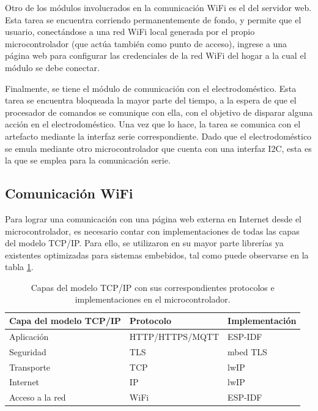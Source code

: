 Otro de los módulos involucrados en la comunicación WiFi es el del servidor web. Esta tarea se encuentra corriendo permanentemente de fondo, y permite que el usuario, conectándose a una red WiFi local generada por el propio microcontrolador (que actúa también como punto de acceso), ingrese a una página web para configurar las credenciales de la red WiFi del hogar a la cual el módulo se debe conectar.

Finalmente, se tiene el módulo de comunicación con el electrodoméstico. Esta tarea se encuentra bloqueada la mayor parte del tiempo, a la espera de que el procesador de comandos se comunique con ella, con el objetivo de disparar alguna acción en el electrodoméstico. Una vez que lo hace, la tarea se comunica con el artefacto mediante la interfaz serie correspondiente. Dado que el electrodoméstico se emula mediante otro microcontrolador que cuenta con una interfaz I2C, esta es la que se emplea para la comunicación serie.


\subsection{Comunicación WiFi}
\label{sec:wifi_com}

Para lograr una comunicación con una página web externa en Internet desde el microcontrolador, es necesario contar con implementaciones de todas las capas del modelo TCP/IP. Para ello, se utilizaron en su mayor parte librerías ya existentes optimizadas para sistemas embebidos, tal como puede observarse en la tabla \ref{tab:implementacion_capas}.


\begin{table}[h]
	\centering
	\caption{Capas del modelo TCP/IP con sus correspondientes protocolos e implementaciones en el microcontrolador.}
	\begin{tabular}{l l l}    
		\toprule
		\textbf{Capa del modelo TCP/IP}	& \textbf{Protocolo}	& \textbf{Implementación}	\\
		\midrule
		Aplicación			& HTTP/HTTPS/MQTT		& ESP-IDF					\\
		Seguridad			& TLS					& mbed TLS					\\
		Transporte			& TCP					& lwIP						\\
		Internet			& IP					& lwIP						\\
		Acceso a la red 	& WiFi					& ESP-IDF					\\
		\bottomrule
		\hline
	\end{tabular}
	\label{tab:implementacion_capas}
\end{table}

